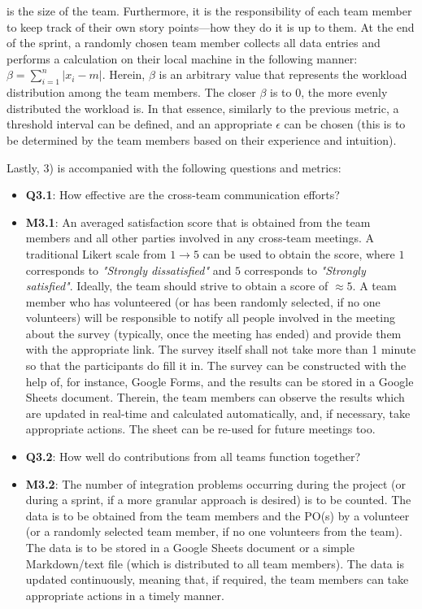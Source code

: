 \documentclass[conference]{IEEEtran}
\begin{document}
\begin{itemize}
    is the size of the team. Furthermore, it is the responsibility of each team
    member to keep track of their own story points---how they do it is up to
    them. At the end of the sprint, a randomly chosen team member collects all
    data entries and performs a calculation on their local machine in the
    following manner: $\beta = \sum_{i=1}^{n} |x_i - m|$. Herein, $\beta$ is an
    arbitrary value that represents the workload distribution among the team
    members. The closer $\beta$ is to $0$, the more evenly distributed the
    workload is. In that essence, similarly to the previous metric, a threshold
    interval can be defined, and an appropriate $\epsilon$ can be chosen (this
    is to be determined by the team members based on their experience and
    intuition).
\end{itemize}

Lastly, 3) is accompanied with the following questions and metrics:

\begin{itemize}
  \item \textbf{Q3.1}: How effective are the cross-team communication efforts?
  \item \textbf{M3.1}: An averaged satisfaction score that is obtained from the
    team members and all other parties involved in any cross-team meetings. A
    traditional Likert scale from $1 \to 5$ can be used to obtain the score,
    where $1$ corresponds to \textit{"Strongly dissatisfied"} and $5$
    corresponds to \textit{"Strongly satisfied"}. Ideally, the team should
    strive to obtain a score of $\approx 5$. A team member who has volunteered
    (or has been randomly selected, if no one volunteers) will be responsible
    to notify all people involved in the meeting about the survey (typically,
    once the meeting has ended) and provide them with the appropriate link. The
    survey itself shall not take more than 1 minute so that the participants do
    fill it in. The survey can be constructed with the help of, for instance,
    Google Forms, and the results can be stored in a Google Sheets document.
    Therein, the team members can observe the results which are updated in
    real-time and calculated automatically, and, if necessary, take appropriate
    actions. The sheet can be re-used for future meetings too.
  \item \textbf{Q3.2}: How well do contributions from all teams function together?
  \item \textbf{M3.2}: The number of integration problems occurring during the
    project (or during a sprint, if a more granular approach is desired) is to
    be counted. The data is to be obtained from the team members and the PO(s)
    by a volunteer (or a randomly selected team member, if no one volunteers from
    the team). The data is to be stored in a Google Sheets document or a simple
    Markdown/text file (which is distributed to all team members). The data
    is updated continuously, meaning that, if required, the team members can
    take appropriate actions in a timely manner.
\end{itemize}
\end{document}
